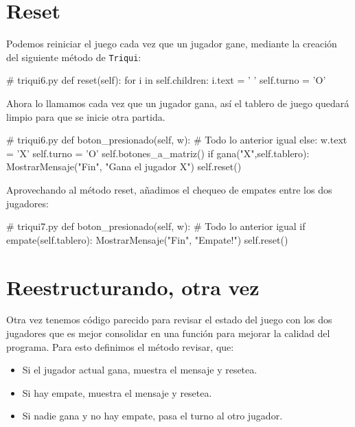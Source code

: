 \section{Reset}

Podemos reiniciar el juego cada vez que un jugador gane, mediante
la creación del siguiente método de \texttt{Triqui}:

\begin{pythoncode}
# triqui6.py
   def reset(self):
        for i in self.children:
            i.text = ' '
        self.turno = 'O'
\end{pythoncode}

Ahora lo llamamos cada vez que un jugador gana, así el tablero de
juego quedará limpio para que se inicie otra partida.

\begin{pythoncode}
# triqui6.py
    def boton_presionado(self, w):
        # Todo lo anterior igual
        else:
                w.text = 'X'
                self.turno = 'O'
                self.botones_a_matriz()
                if gana("X",self.tablero):
                    MostrarMensaje("Fin", "Gana el jugador X")
                    self.reset()
\end{pythoncode}

Aprovechando al método reset, añadimos el chequeo de empates entre
los dos jugadores:

\begin{pythoncode}
# triqui7.py
    def boton_presionado(self, w):
        # Todo lo anterior igual
            if empate(self.tablero):
                MostrarMensaje("Fin", "Empate!")
                self.reset()
\end{pythoncode}

\section{Reestructurando, otra vez}

Otra vez tenemos código parecido para revisar el estado del juego
con los dos jugadores que es mejor consolidar en una función para
mejorar la calidad del programa. Para esto definimos el método revisar,
que:
\begin{itemize}
\item Si el jugador actual gana, muestra el mensaje y resetea.
\item Si hay empate, muestra el mensaje y resetea.
\item Si nadie gana y no hay empate, pasa el turno al otro jugador. 
\end{itemize}

